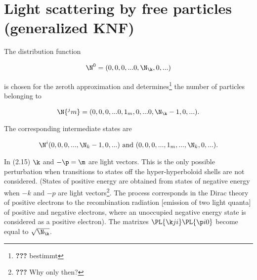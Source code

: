 \documentclass{article}
\newcommand{\WTF}[1]{\footnote{\textbf{???} #1}}
\newcommand{\uequ}[1]{
\begin{align*}
#1
\end{align*}
}
\begin{document}
\section{Light scattering by free particles (generalized KNF)}

The distribution function
\uequ{
\N^0=(0,0,0,...0, \N_{\k}, 0, ...)
}

is chosen for the zeroth approximation and determines\WTF{bestimmt} the number of particles belonging to
\uequ{
\N{^jm} = (0, 0, 0, ... 0, 1_m, 0, ... 0, \N_{\k} - 1, 0, ... ).
}
The corresponding intermediate states are
\uequ{
\N^i(0,0,0,...,\N_k-1, 0,...)\text{ and } (0,0,0,...,1_m,...,\N_k,0,...).
}
In (2.15) $\k$ and $-\p=\m$ are light vectors. This is the only possible perturbation when transitions to states off the hyper-hyperboloid shells are not considered. (States of positive energy are obtained from states of negative energy when $-k$ and $-p$ are light vectors\WTF{Why only then?}. The process corresponds in the Dirac theory of positive electrons to the recombination radiation [emission of two light quanta] of positive and negative electrons, where an unoccupied negative energy state is considered as a positive electron). The matrixes $\PL{\k j i}\PL{\p i 0}$ become equal to $\sqrt{\N_\k}$.
\end{document}
